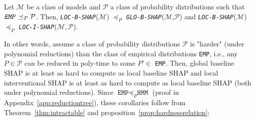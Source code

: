 \begin{proposition} \label{prop:hardnessrelation}
  \begin{inparaenum}[(i)]
    Let $\mathcal{M}$ be a class of models and $\mathcal{P}$ a class of probability distributions such that $\texttt{\emph{EMP}} \preceq_{P}  \mathcal{P}$. %
    Then, \texttt{\emph{LOC-B-SHAP}}($\mathcal{M}$)  $\preceq_{P}$ \texttt{\emph{GLO-B-SHAP}}($\mathcal{M}$,$\mathcal{P}$) and \texttt{\emph{LOC-B-SHAP}}($\mathcal{M}$)  $\preceq_{P}$   \texttt{\emph{LOC-I-SHAP}}($\mathcal{M},\mathcal{P}$).
    \end{inparaenum}
\end{proposition}


In other words, assume a class of probability distributions $\mathcal{P}$ is "harder" (under polynomial reductions) than the class of empirical distributions \texttt{EMP}, i.e., any $P \in \mathcal{P}$ can be reduced in poly-time to some $P' \in$ \texttt{EMP}. Then, global baseline SHAP is at least as hard to compute as local baseline SHAP and local interventional SHAP is at least as hard to compute as local baseline SHAP (both under polynomial reductions). Since $\texttt{EMP} \preceq_{P} \texttt{HMM}$ (proof in Appendix~\ref{app:reductiontree}), these corollaries follow from Theorem~\ref{thm:intractable} and proposition~\ref{prop:hardnessrelation}:



